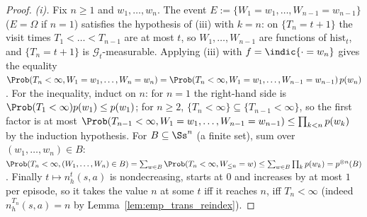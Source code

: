 \begin{proof}
\emph{(i).} Fix $n \ge 1$ and $w_1, \dots, w_n$. The event $E := \{W_1 = w_1, \dots, W_{n-1} = w_{n-1}\}$
($E = \Omega$ if $n = 1$) satisfies the hypothesis of (iii) with $k = n$: on $\{T_n = t + 1\}$
the visit times $T_1 < \dots < T_{n-1}$ are at most $t$, so $W_1, \dots, W_{n-1}$ are functions
of $\mathrm{hist}_t$, and $\{T_n = t+1\}$ is $\mathcal G_t$-measurable. Applying (iii) with
$f = \indic\{\cdot = w_n\}$ gives the equality
$\Prob(T_n < \infty, W_1 = w_1, \dots, W_n = w_n) = \Prob(T_n < \infty, W_1 = w_1, \dots, W_{n-1} = w_{n-1})\,p(w_n)$.
For the inequality, induct on $n$: for $n = 1$ the right-hand side is $\Prob(T_1 < \infty)p(w_1) \le p(w_1)$;
for $n \ge 2$, $\{T_n < \infty\} \subseteq \{T_{n-1} < \infty\}$, so the first factor is at most
$\Prob(T_{n-1} < \infty, W_1 = w_1, \dots, W_{n-1} = w_{n-1}) \le \prod_{k < n} p(w_k)$ by the
induction hypothesis. For $B \subseteq \Ss^n$ (a finite set), sum over $(w_1,\dots,w_n) \in B$:
$\Prob(T_n < \infty, (W_1,\dots,W_n) \in B) = \sum_{w \in B}\Prob(T_n < \infty, W_{\le n} = w) \le \sum_{w \in B}\prod_k p(w_k) = p^{\otimes n}(B)$.
Finally $t \mapsto n^t_h(s,a)$ is nondecreasing, starts at $0$ and increases by at most $1$ per
episode, so it takes the value $n$ at some $t$ iff it reaches $n$, iff $T_n < \infty$
(indeed $n^{T_n}_h(s,a) = n$ by Lemma~\ref{lem:emp_trans_reindex}).
\end{proof}

